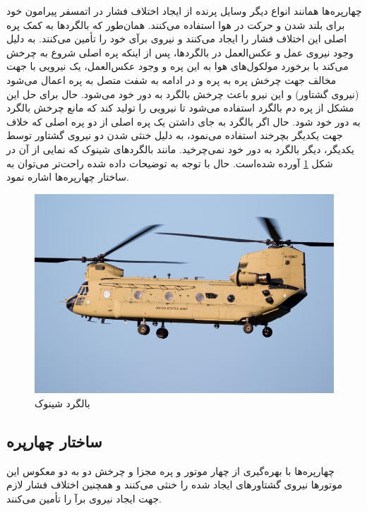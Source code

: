 چهارپره‌ها همانند انواع دیگر وسایل پرنده از ایجاد اختلاف فشار در اتمسفر پیرامون خود برای بلند شدن و حرکت در هوا استفاده می‌کنند. همان‌طور که بالگردها به کمک پره اصلی این اختلاف فشار را ایجاد می‌کنند و نیروی برآی
 خود را تأمین می‌کنند. به دلیل وجود نیروی عمل و عکس‌العمل در بالگردها، پس از اینکه پره اصلی شروع به چرخش می‌کند با برخورد مولکول‌های هوا به این پره و وجود عکس‌العمل، یک نیرویی با جهت مخالف جهت چرخش پره به پره و در ادامه به شفت متصل به پره اعمال می‌شود (نیروی گشتاور) و این نیرو باعث چرخش بالگرد به دور خود می‌شود. حال برای حل این مشکل از پره دم بالگرد استفاده می‌شود تا نیرویی را تولید کند که مانع چرخش بالگرد به دور خود شود. حال اگر بالگرد به جای داشتن یک پره اصلی از دو پره اصلی که خلاف جهت یکدیگر بچرخند استفاده می‌نمود، به دلیل خنثی شدن دو نیروی گشتاور توسط یکدیگر، دیگر بالگرد به دور خود نمی‌چرخید. مانند بالگردهای شینوک که نمایی از آن در شکل
\ref{chinook}
  آورده شده‌است. حال با توجه به توضیحات داده شده راحت‌تر می‌توان به ساختار چهارپره‌ها اشاره نمود.
\begin{figure}[H]
	\includegraphics[width=12cm]{../../Figures/introduction/boeing-ch-chinook.jpg}
	\centering
	\caption{بالگرد شینوک
		\cite{CH-47}}
	\label{chinook}
\end{figure}
\subsection{ساختار چهارپره}


چهارپره‌ها با بهره‌گیری از چهار موتور و پره مجزا و چرخش دو به دو معکوس این موتورها نیروی گشتاورهای ایجاد شده را خنثی می‌کنند و همچنین اختلاف فشار لازم جهت ایجاد نیروی برآ را تأمین می‌کنند.

